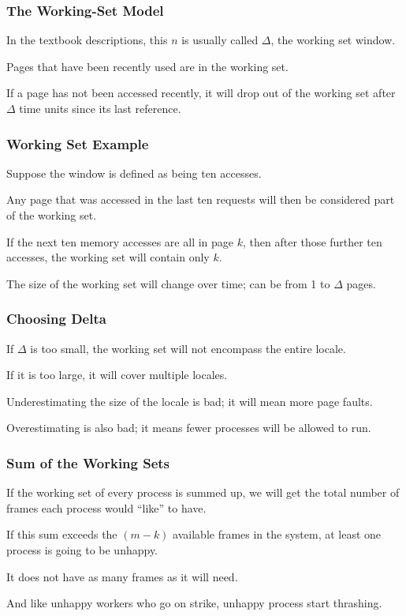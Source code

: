 \begin{frame}
\frametitle{The Working-Set Model}

In the textbook descriptions, this $n$ is usually called $\Delta$, the working set window. 

Pages that have been recently used are in the working set. 

If a page has not been accessed recently, it will drop out of the working set after $\Delta$ time units since its last reference. 

\end{frame}

\begin{frame}
\frametitle{Working Set Example}

Suppose the window is defined as being ten accesses. 

Any page that was accessed in the last ten requests will then be considered part of the working set. 

If the next ten memory accesses are all in page $k$, then after those further ten accesses, the working set will contain only $k$. 

The size of the working set will change over time; can be from 1 to $\Delta$ pages.

\end{frame}

\begin{frame}
\frametitle{Choosing Delta}

If $\Delta$ is too small, the working set will not encompass the entire locale. 

If it is too large, it will cover multiple locales. 

Underestimating the size of the locale is bad; it will mean more page faults.


Overestimating is also bad; it means fewer processes will be allowed to run.

\end{frame}

\begin{frame}
\frametitle{Sum of the Working Sets}

If the working set of every process is summed up, we will get the total number of frames each process would ``like'' to have. 

If this sum exceeds the $(m-k)$ available frames in the system, at least one process is going to be unhappy.

It does not have as many frames as it will need. 

And like unhappy workers who go on strike, unhappy process start thrashing.


\end{frame}

